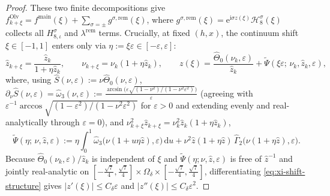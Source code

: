 \documentclass[11pt]{article}
\theoremstyle{definition}
\theoremstyle{remark}
\newcommand{\dd}{\mathrm{d}}
\newcommand{\ii}{\mathrm{i}}
\renewcommand{\_}{\oldunderscore\penalty0\hskip0pt\relax}
\begin{document}
\begin{proof}
These two finite decompositions give
  $f_{k+\xi}^{\mathrm{Olv}}=f^{\mathrm{main}}(\xi)+\sum_{\sigma=\pm}g^{\sigma,\mathrm{rem}}(\xi)$, where
  $g^{\sigma,\mathrm{rem}}(\xi)=\mathrm{e}^{\ii\sigma z(\xi)}\mathcal{H}_8^\sigma(\xi)$ collects all $H_{8,\iota}^\sigma$ and
  $\lambda^{\mathrm{rem}}$ terms. Crucially, at fixed $(h,x)$, the continuum shift $\xi\in[-1,1]$ enters only via
  $\eta:=\xi\varepsilon\in[-\varepsilon,\varepsilon]$:
\begin{equation}
  \hat{z}_{k+\xi} = \frac{\hat{z}_k}{1+\eta\hat{z}_k},\qquad
  \nu_{k+\xi} = \nu_k(1+\eta\hat{z}_k),\qquad
  z(\xi) = \frac{\widehat{\Theta}_0(\nu_k,\varepsilon)}{\hat{z}_k} + \widetilde{\Psi}(\xi\varepsilon;\,\nu_k,\hat{z}_k,\varepsilon),
  \label{eq:xi-shift-structure}
\end{equation}
where, using $\widehat{S}(\nu,\varepsilon):=\nu\widehat{\Theta}_0(\nu,\varepsilon)$,
  $\partial_\nu\widehat{S}(\nu,\varepsilon)=\widehat{\omega}_3(\nu,\varepsilon):=\frac{\arcsin\!\bigl(\varepsilon\sqrt{(1-\nu^2)/(1-\nu^2\varepsilon^2)}\bigr)}{\varepsilon}$
  (agreeing with $\varepsilon^{-1}\arccos\sqrt{(1-\varepsilon^2)/(1-\nu^2\varepsilon^2)}$ for $\varepsilon>0$ and extending
  evenly and real-analytically through $\varepsilon=0$), and $\nu_{k+\xi}^2\hat{z}_{k+\xi}=\nu_k^2\hat{z}_k(1+\eta\hat{z}_k)$,
\begin{equation}
  \widetilde{\Psi}(\eta;\,\nu,\hat{z},\varepsilon) :=
    \eta\int_0^1\widehat{\omega}_3\bigl(\nu(1+u\eta\hat{z}),\varepsilon\bigr)\,\dd u +
    \nu^2\hat{z}(1+\eta\hat{z})\,\widehat{\Gamma}_2\bigl(\nu(1+\eta\hat{z}),\varepsilon\bigr).
\end{equation}
Because $\widehat{\Theta}_0(\nu_k,\varepsilon)/\hat{z}_k$ is independent of $\xi$ and
  $\widetilde{\Psi}(\eta;\nu,\hat{z},\varepsilon)$ is free of $\hat{z}^{-1}$ and jointly real-analytic on
  $[-\frac{\sqrt{7}}{4},\frac{\sqrt{7}}{4}]\times\Omega_\delta\times[-\frac{\sqrt{7}}{4},\frac{\sqrt{7}}{4}]$, differentiating
  \eqref{eq:xi-shift-structure} gives $|z'(\xi)|\le C_\delta\varepsilon$ and $|z''(\xi)|\le C_\delta\varepsilon^2$.


\end{proof}
\end{document}
